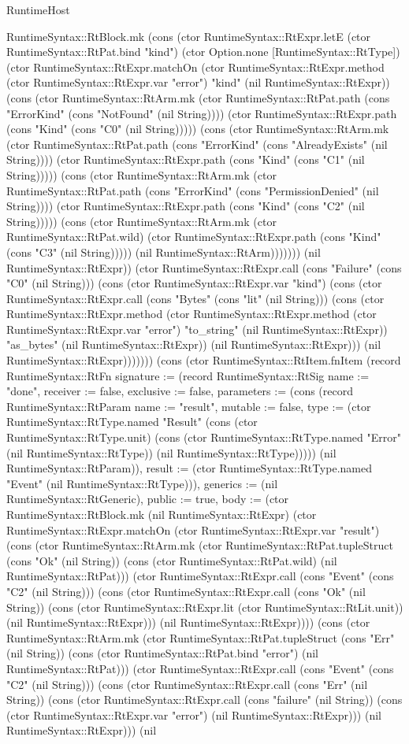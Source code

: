 \begin{lexlean}{RuntimeHost}
\begin{semanticmodule}
{RuntimeSyntax::RtBlock.mk (cons (ctor RuntimeSyntax::RtExpr.letE (ctor RuntimeSyntax::RtPat.bind "kind") (ctor Option.none [RuntimeSyntax::RtType]) (ctor RuntimeSyntax::RtExpr.matchOn (ctor RuntimeSyntax::RtExpr.method (ctor RuntimeSyntax::RtExpr.var "error") "kind" (nil RuntimeSyntax::RtExpr)) (cons (ctor RuntimeSyntax::RtArm.mk (ctor RuntimeSyntax::RtPat.path (cons "ErrorKind" (cons "NotFound" (nil String)))) (ctor RuntimeSyntax::RtExpr.path (cons "Kind" (cons "C0" (nil String))))) (cons (ctor RuntimeSyntax::RtArm.mk (ctor RuntimeSyntax::RtPat.path (cons "ErrorKind" (cons "AlreadyExists" (nil String)))) (ctor RuntimeSyntax::RtExpr.path (cons "Kind" (cons "C1" (nil String))))) (cons (ctor RuntimeSyntax::RtArm.mk (ctor RuntimeSyntax::RtPat.path (cons "ErrorKind" (cons "PermissionDenied" (nil String)))) (ctor RuntimeSyntax::RtExpr.path (cons "Kind" (cons "C2" (nil String))))) (cons (ctor RuntimeSyntax::RtArm.mk (ctor RuntimeSyntax::RtPat.wild) (ctor RuntimeSyntax::RtExpr.path (cons "Kind" (cons "C3" (nil String))))) (nil RuntimeSyntax::RtArm))))))) (nil RuntimeSyntax::RtExpr)) (ctor RuntimeSyntax::RtExpr.call (cons "Failure" (cons "C0" (nil String))) (cons (ctor RuntimeSyntax::RtExpr.var "kind") (cons (ctor RuntimeSyntax::RtExpr.call (cons "Bytes" (cons "lit" (nil String))) (cons (ctor RuntimeSyntax::RtExpr.method (ctor RuntimeSyntax::RtExpr.method (ctor RuntimeSyntax::RtExpr.var "error") "to_string" (nil RuntimeSyntax::RtExpr)) "as_bytes" (nil RuntimeSyntax::RtExpr)) (nil RuntimeSyntax::RtExpr))) (nil RuntimeSyntax::RtExpr)))))})) (cons (ctor RuntimeSyntax::RtItem.fnItem (record RuntimeSyntax::RtFn {signature := (record RuntimeSyntax::RtSig {name := "done", receiver := false, exclusive := false, parameters := (cons (record RuntimeSyntax::RtParam {name := "result", mutable := false, type := (ctor RuntimeSyntax::RtType.named "Result" (cons (ctor RuntimeSyntax::RtType.unit) (cons (ctor RuntimeSyntax::RtType.named "Error" (nil RuntimeSyntax::RtType)) (nil RuntimeSyntax::RtType))))}) (nil RuntimeSyntax::RtParam)), result := (ctor RuntimeSyntax::RtType.named "Event" (nil RuntimeSyntax::RtType))}), generics := (nil RuntimeSyntax::RtGeneric), public := true, body := (ctor RuntimeSyntax::RtBlock.mk (nil RuntimeSyntax::RtExpr) (ctor RuntimeSyntax::RtExpr.matchOn (ctor RuntimeSyntax::RtExpr.var "result") (cons (ctor RuntimeSyntax::RtArm.mk (ctor RuntimeSyntax::RtPat.tupleStruct (cons "Ok" (nil String)) (cons (ctor RuntimeSyntax::RtPat.wild) (nil RuntimeSyntax::RtPat))) (ctor RuntimeSyntax::RtExpr.call (cons "Event" (cons "C2" (nil String))) (cons (ctor RuntimeSyntax::RtExpr.call (cons "Ok" (nil String)) (cons (ctor RuntimeSyntax::RtExpr.lit (ctor RuntimeSyntax::RtLit.unit)) (nil RuntimeSyntax::RtExpr))) (nil RuntimeSyntax::RtExpr)))) (cons (ctor RuntimeSyntax::RtArm.mk (ctor RuntimeSyntax::RtPat.tupleStruct (cons "Err" (nil String)) (cons (ctor RuntimeSyntax::RtPat.bind "error") (nil RuntimeSyntax::RtPat))) (ctor RuntimeSyntax::RtExpr.call (cons "Event" (cons "C2" (nil String))) (cons (ctor RuntimeSyntax::RtExpr.call (cons "Err" (nil String)) (cons (ctor RuntimeSyntax::RtExpr.call (cons "failure" (nil String)) (cons (ctor RuntimeSyntax::RtExpr.var "error") (nil RuntimeSyntax::RtExpr))) (nil RuntimeSyntax::RtExpr))) (nil }
\end{semanticmodule}
\end{lexlean}
